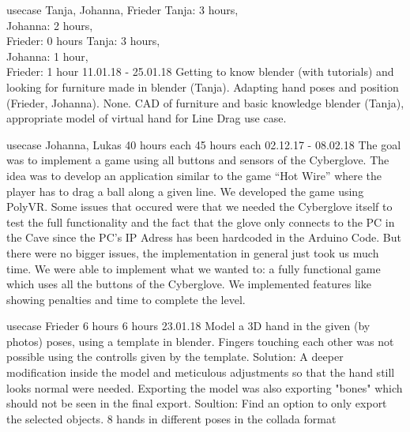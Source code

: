 	{usecase}%
	{Tanja, Johanna, Frieder}%
	{Tanja: 3 hours, \\
	Johanna: 2 hours,\\
	Frieder: 0 hours}%
	{Tanja: 3 hours,\\
	Johanna: 1 hour,\\
	Frieder: 1 hour}%
	{11.01.18 - 25.01.18}%
	{Getting to know blender (with tutorials) and looking for furniture made in blender (Tanja). Adapting hand poses and position (Frieder, Johanna).}%
	{None.}%
	{CAD of furniture and basic knowledge blender (Tanja), appropriate model of virtual hand for Line Drag use case.}%
	
	{usecase}%
	{Johanna, Lukas}%
	{40 hours each}%
	{45 hours each}%
	{02.12.17 - 08.02.18}%
	{The goal was to implement a game using all buttons and sensors of the 
	Cyberglove. The idea was to develop an application similar to the game
	``Hot Wire'' where the player has to drag a ball along a given line.}%
	{We developed the game using PolyVR. Some issues that occured were that we needed the Cyberglove itself to test the full functionality and the fact that the glove only connects to the PC in the Cave since the PC's IP Adress has been hardcoded in the Arduino Code. But there were no bigger issues, the implementation in general just took us much time.}%
	{We were able to implement what we wanted to: a fully functional game which uses all the buttons of the Cyberglove. We implemented features like showing penalties and time to complete the level.}%
	
	{usecase}%
	{Frieder} %
	{6 hours} %
	{6 hours} %
	{23.01.18} %
	{Model a 3D hand in the given (by photos) poses, using  a template in blender.}%
	{Fingers touching each other was not possible using the controlls  given by the template. Solution: A deeper modification inside the model and meticulous adjustments so that the hand still looks normal were needed. Exporting the model was also exporting "bones" which should not be seen in the final export. Soultion: Find an option to only export the selected objects.}%
	{8 hands in different poses in the collada format}%
	
